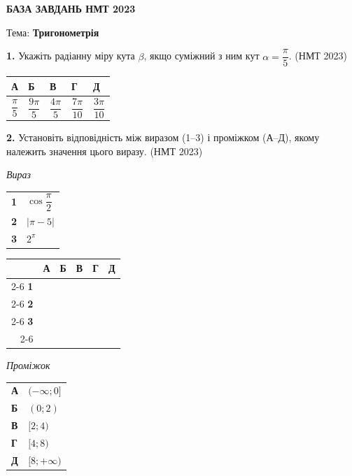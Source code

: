 \documentclass[14pt]{extarticle}
\newcommand{\answerTableTall}[5]{
\begin{center}
\begin{tabular}{|*{5}{>{\centering\arraybackslash}m{2.8cm}|}}
\hline
\rule[-0.3cm]{0pt}{0.8cm}\textbf{А} & \textbf{Б} & \textbf{В} & \textbf{Г} & \textbf{Д} \\
\hline
\rule[-0.9cm]{0pt}{2.0cm}#1 & 
\rule[-0.9cm]{0pt}{2.0cm}#2 & 
\rule[-0.9cm]{0pt}{2.0cm}#3 & 
\rule[-0.9cm]{0pt}{2.0cm}#4 & 
\rule[-0.9cm]{0pt}{2.0cm}#5 \\
\hline
\end{tabular}
\end{center}
}
\newcommand{\answerGrid}{
    \begingroup
    \renewcommand{\arraystretch}{1.3} 
    \setlength{\tabcolsep}{7pt} 
    \begin{tabular}{r|c|c|c|c|c|}
         \multicolumn{1}{c}{} & \multicolumn{1}{c}{\textbf{А}} & \multicolumn{1}{c}{\textbf{Б}} & \multicolumn{1}{c}{\textbf{В}} & \multicolumn{1}{c}{\textbf{Г}} & \multicolumn{1}{c}{\textbf{Д}} \\ \cline{2-6}
         \textbf{1} & & & & & \\ \cline{2-6}
         \textbf{2} & & & & & \\ \cline{2-6}
         \textbf{3} & & & & & \\ \cline{2-6}
    \end{tabular}
    \endgroup
}
\newcommand{\nmtyear}[1]{\hfill{\small\color{yearcolor}(НМТ #1)}}
\begin{document}
\vspace{1cm}

\begin{center}
{\Large\textbf{\color{headerblue}БАЗА ЗАВДАНЬ НМТ 2023}}
\end{center}

\begin{center}
{\large Тема: \textbf{Тригонометрія}}
\end{center}

\newcommand{\trigStyle}[1]{\textbf{#1}}

\noindent\textbf{1.} Укажіть радіанну міру кута $\beta$, якщо суміжний з ним кут $\alpha = \dfrac{\pi}{5}$. \nmtyear{2023}


\vspace{0.3cm}
\answerTableTall{$\dfrac{\pi}{5}$}{$\dfrac{9\pi}{5}$}{$\dfrac{4\pi}{5}$}{$\dfrac{7\pi}{10}$}{$\dfrac{3\pi}{10}$}

\vspace{0.7cm}

\noindent\textbf{2.} Установіть відповідність між виразом (1--3) і проміжком (А--Д), якому належить значення цього виразу. \nmtyear{2023}


\vspace{0.3cm}

\noindent
\begin{minipage}[t]{0.45\textwidth}
    \textit{Вираз} \par \vspace{0.2cm}
    \begin{tabular}{@{}p{0.5cm} l@{}}
    \textbf{1} & \trigStyle{$\cos \dfrac{\pi}{2}$} \\[0.4cm]
    \textbf{2} & $|\pi - 5|$ \\[0.4cm]
    \textbf{3} & $2^{\pi}$ \\
    \end{tabular}

    \vspace{1.0cm}
    \answerGrid
\end{minipage}%
\hfill
\begin{minipage}[t]{0.50\textwidth}
    \textit{Проміжок} \par \vspace{0.2cm}
    \begin{tabular}{@{}p{0.5cm} l@{}}
    \textbf{А} & $(-\infty; 0]$ \\[0.2cm]
    \textbf{Б} & $(0; 2)$ \\[0.2cm]
    \textbf{В} & $[2; 4)$ \\[0.2cm]
    \textbf{Г} & $[4; 8)$ \\[0.2cm]
    \textbf{Д} & $[8; +\infty)$ \\
    \end{tabular}
\end{minipage}
\end{document}
